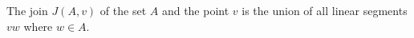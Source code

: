 The join $J(A, v)$ of the set $A$ and the point $v$ is the union of all linear segments $vw$ where $w \in A$.
